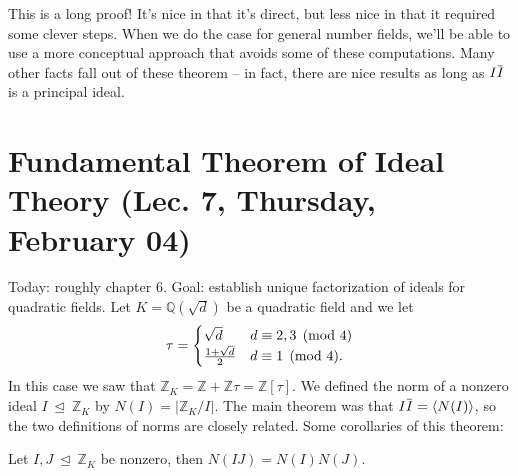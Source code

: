 \begin{remark}

This is a long proof! It's nice in that it's direct, but less nice in
that it required some clever steps. When we do the case for general
number fields, we'll be able to use a more conceptual approach that
avoids some of these computations. Many other facts fall out of these
theorem -- in fact, there are nice results as long as
\(I \mkern 1.5mu\overline{\mkern-1.5muI\mkern-1.5mu}\mkern 1.5mu\) is a
principal ideal.

\end{remark}

\hypertarget{fundamental-theorem-of-ideal-theory-lec.-7-thursday-february-04}{%
\section{Fundamental Theorem of Ideal Theory (Lec. 7, Thursday, February
04)}\label{fundamental-theorem-of-ideal-theory-lec.-7-thursday-february-04}}

\begin{remark}

Today: roughly chapter 6. Goal: establish unique factorization of ideals
for quadratic fields. Let \(K = {\mathbb{Q}}(\sqrt d)\) be a quadratic
field and we let
\begin{align*}
\tau = 
\begin{cases}
\sqrt d & d \equiv 2,3 \pmod 4  
\\
{1 + \sqrt{d} \over 2} & d \equiv 1 \pmod 4.
\end{cases}
\end{align*}
In this case we saw that
\({\mathbb{Z}}_K = {\mathbb{Z}}+ {\mathbb{Z}}\tau = {\mathbb{Z}}[\tau]\).
We defined the norm of a nonzero ideal
\(I{~\trianglelefteq~}{\mathbb{Z}}_K\) by
\(N(I) = {\left\lvert {{\mathbb{Z}}_K/I} \right\rvert}\). The main
theorem was that
\(I \mkern 1.5mu\overline{\mkern-1.5muI\mkern-1.5mu}\mkern 1.5mu = \left\langle{ N(I)}\right\rangle\),
so the two definitions of norms are closely related. Some corollaries of
this theorem:

\end{remark}

\begin{corollary}

Let \(I, J {~\trianglelefteq~}{\mathbb{Z}}_K\) be nonzero, then
\(N(IJ) = N(I) N(J)\).

\end{corollary}

